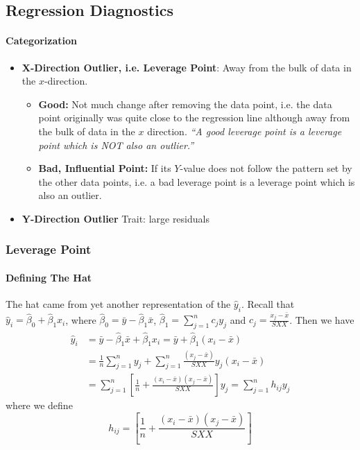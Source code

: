 \documentclass[10pt]{article}
\begin{document}
\subsection{Regression Diagnostics}
\paragraph{Categorization}
\begin{itemize}
    \item \textbf{X-Direction Outlier, i.e. Leverage Point}: Away from the bulk of data in the $x$-direction. 
    \begin{itemize}
        \item \textbf{Good:} Not much change after removing the data point, i.e. the data point originally was quite close to the regression line although away from the bulk of data in the $x$ direction. \textit{``A good leverage point is a leverage point which is NOT also an outlier.''}
        \item \textbf{Bad, Influential Point:} If its $Y$-value does not follow the pattern set by the other data points, i.e. a bad leverage point is a leverage point which is also an outlier. 
    \end{itemize}
    \item \textbf{Y-Direction Outlier} Trait: large residuals
\end{itemize}

\subsubsection{Leverage Point}
\paragraph{Defining The Hat}
The hat came from yet another representation of the $\hat{y}_i$. Recall that $\hat{y}_{i}=\hat{\beta}_{0}+\hat{\beta}_{1} x_{i}$, where $\hat{\beta}_{0}=\bar{y}-\hat{\beta}_{1} \bar{x}$, $\hat{\beta}_{1}=\sum_{j=1}^{n} c_{j} y_{j}$ and $c_{j}=\frac{x_{j}-\bar{x}}{S X X}$.
Then we have
\begin{align*}
    \hat{y}_{i}	
    &=\bar{y}-\hat{\beta}_{1} \bar{x}+\hat{\beta}_{1} x_{i} 
    =\bar{y}+\hat{\beta}_{1}\left(x_{i}-\bar{x}\right) \\
    &=\frac{1}{n} \sum_{j=1}^{n} y_{j}+\sum_{j=1}^{n} \frac{\left(x_{j}-\bar{x}\right)}{S X X} y_{j}\left(x_{i}-\bar{x}\right) \\
    &=\sum_{j=1}^{n}\left[\frac{1}{n}+\frac{\left(x_{i}-\bar{x}\right)\left(x_{j}-\bar{x}\right)}{S X X}\right] y_{j} 
    =\sum_{j=1}^{n} h_{i j} y_{j}
\end{align*}
where we define
\begin{equation*}
    h_{i j}=\left[\frac{1}{n}+\frac{\left(x_{i}-\bar{x}\right)\left(x_{j}-\bar{x}\right)}{S X X}\right]
\end{equation*}
\end{document}
